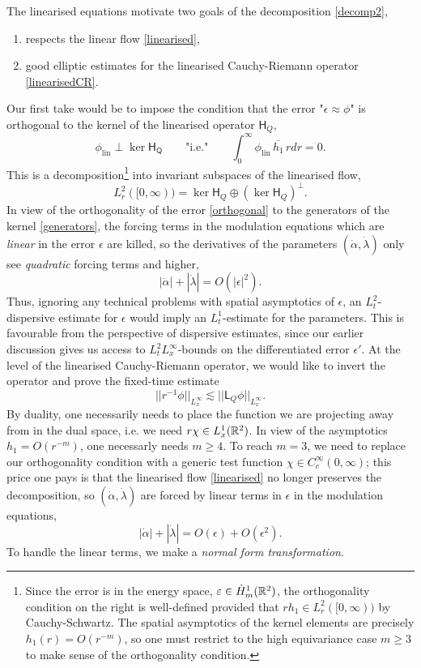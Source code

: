 The linearised equations motivate two goals of the decomposition \eqref{decomp2},
\begin{enumerate}
    \item respects the linear flow \eqref{linearised},
    \item good elliptic estimates for the linearised Cauchy-Riemann operator \eqref{linearisedCR}. 
\end{enumerate}
Our first take would be to impose the condition that the error "$\epsilon \approx \phi$" is orthogonal to the kernel of the linearised operator $\mathsf H_Q$, 
\begin{equation}\label{eq:orthogonal}
    \phi_{\mathrm{lin}} \perp \ker \mathsf{H_Q} \qquad \text{"i.e."} \qquad \int_0^\infty \phi_{\mathrm{lin}} \, \overline{h_1} \, r dr 
        = 0. 
\end{equation}
This is a decomposition\footnote{Since the error is in the energy space, $\varepsilon \in \dot H^1_m (\mathbb R^2)$, the orthogonality condition on the right is well-defined provided that $rh_1 \in L^2_r ([0, \infty))$ by Cauchy-Schwartz. The spatial asymptotics of the kernel elements are precisely $h_1 (r) = O(r^{-m})$, so one must restrict to the high equivariance case $m \geq 3$ to make sense of the orthogonality condition. } into invariant subspaces of the linearised flow, 
\[
    L^2_r ([0, \infty)) = \ker \mathsf H_Q \oplus (\ker \mathsf H_Q)^\perp.
\]
In view of the orthogonality of the error \eqref{orthogonal} to the generators of the kernel \eqref{generators}, the forcing terms in the modulation equations which are \textit{linear} in the error $\epsilon$ are killed, so
the derivatives of the parameters $(\dot{\alpha}, \dot{\lambda})$ only see \textit{quadratic} forcing terms and higher,
\begin{equation}\label{eq:quadratic}
    |\dot \alpha| + |\dot{\lambda}| 
        = O(|\epsilon|^2). 
\end{equation}
Thus, ignoring any technical problems with spatial asymptotics of $\epsilon$, an $L^2_t$-dispersive estimate for $\epsilon$ would imply an $L^1_t$-estimate for the parameters. This is favourable from the perspective of dispersive estimates, since our earlier discussion gives us access to $L^2_t L^\infty_x$-bounds on the differentiated error $\epsilon'$. At the level of the linearised Cauchy-Riemann operator, we would like to invert the operator and prove the fixed-time estimate 
    \[
        || r^{-1}\phi ||_{L^\infty_x} 
            \lesssim ||\mathsf L_Q \phi||_{L^\infty_x}.
    \]
By duality, one necessarily needs to place the function we are projecting away from in the dual space, i.e. we need $r \chi \in L^1_x (\mathbb R^2)$. In view of the asymptotics $h_1 = O(r^{-m})$, one necessarly needs $m \geq 4$. To reach $m = 3$, we need to replace our orthogonality condition with a generic test function $\chi \in C^\infty_c (0, \infty)$; this price one pays is that the linearised flow \eqref{linearised} no longer preserves the decomposition, so $(\dot{\alpha}, \dot{\lambda})$ are forced by linear terms in $\epsilon$ in the modulation equations,
    \[
        |\dot{\alpha}| + |\dot{\lambda}| 
            = O(\epsilon) + O(\epsilon^2). 
    \]
To handle the linear terms, we make a \textit{normal form transformation}.




